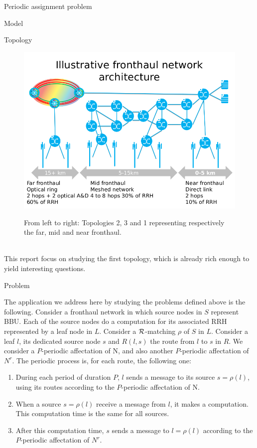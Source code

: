 \documentclass[a4paper,10pt]{report}
\begin{document}
\begin{chapter}{Periodic assignment problem}
\begin{section}{Model}
\begin{subsection}{Topology}
{{\begin{figure}[H]
\begin{center}
\includegraphics[scale=0.4]{fronthaul0.png}\\

\end{center}
\caption{From left to right: Topologies 2, 3 and 1 representing respectively the far, mid and near fronthaul.}
\end{figure}
}}\\

This report focus on studying the first topology, which is already rich enough to yield interesting questions.

\end{subsection}

\end{section}
\begin{section}{Problem}
   
The application we address here by studying the problems defined above is the following. Consider a fronthaul network in which source nodes in $S$ represent BBU.
Each of the source nodes do a computation for its associated RRH represented by a leaf node in $L$. Consider a ${\cal R}$-matching $\rho$ of $S$ in $L$. Consider a leaf $l$, its dedicated source node $s$
and $R(l,s)$ the route from $l$ to $s$ in $R$. We consider a $P$-periodic affectation of N, and also another $P$-periodic affectation of $N^{r}$.
The periodic process is, for each route, the following one:
\begin{enumerate}
 \item During each period of duration $P$, $l$ sends a message to its source $s=\rho(l)$, using its routes according to the $P$-periodic affectation of N. 
 \item When a source $s=\rho(l)$ receive a message from $l$, it makes a computation. This computation time is the same for all sources.
 \item After this computation time, $s$ sends a message to $l=\rho(l)$ according to the $P$-periodic affectation of $N^{r}$.
\end{enumerate}


\end{section}
\end{chapter}
\end{document}
